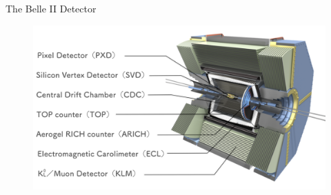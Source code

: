 \documentclass[8pt]{beamer}
\begin{document}
\begin{frame}{The Belle II Detector}

\begin{figure}
	\includegraphics[width=\textwidth]{VBilder/Belle2.pdf}
\end{figure}


	
\end{frame}
\end{document}
